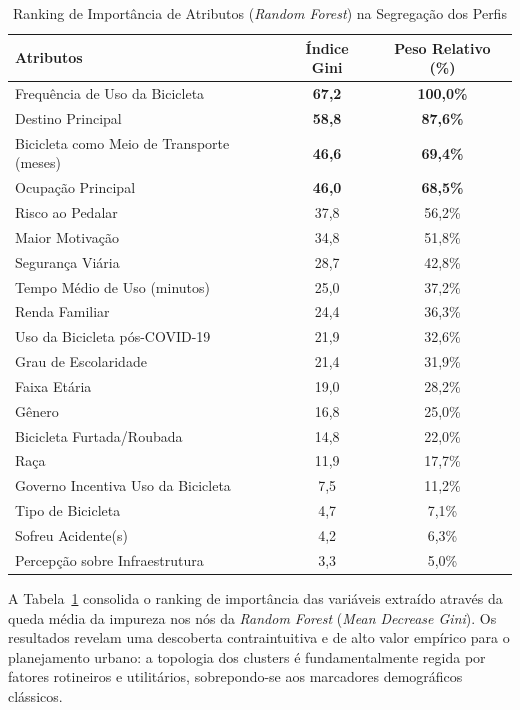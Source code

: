 \documentclass[12pt]{article}
\begin{document}
\begin{table}[htbp]
\centering
\caption{Ranking de Importância de Atributos (\textit{Random Forest}) na Segregação dos Perfis}
\label{tab:rf_importancia}
\begin{tabular}{@{}l|c|c@{}}
\hline \hline
   \textbf{Atributos}              & \textbf{Índice Gini} & \textbf{Peso Relativo (\%)} \\ 
\hline \hline
Frequência de Uso da Bicicleta     & \textbf{67,2} & \textbf{100,0\%} \\
Destino Principal                  & \textbf{58,8} & \textbf{87,6\%} \\
Bicicleta como Meio de Transporte (meses)  & \textbf{46,6} & \textbf{69,4\%} \\
Ocupação Principal                 & \textbf{46,0} & \textbf{68,5\%} \\
Risco ao Pedalar                   & 37,8 & 56,2\% \\
Maior Motivação                    & 34,8 & 51,8\% \\
Segurança Viária                   & 28,7 & 42,8\% \\
Tempo Médio de Uso (minutos)       & 25,0 & 37,2\% \\
Renda Familiar                     & 24,4 & 36,3\% \\
Uso da Bicicleta pós-COVID-19      & 21,9 & 32,6\% \\
Grau de Escolaridade               & 21,4 & 31,9\% \\
Faixa Etária                       & 19,0 & 28,2\% \\
Gênero                             & 16,8 & 25,0\% \\
Bicicleta Furtada/Roubada          & 14,8 & 22,0\% \\
Raça                               & 11,9 & 17,7\% \\
Governo Incentiva Uso da Bicicleta & 7,5  & 11,2\% \\
Tipo de Bicicleta                  & 4,7  & 7,1\% \\
Sofreu Acidente(s)                 & 4,2  & 6,3\% \\
Percepção sobre Infraestrutura     & 3,3  & 5,0\% \\ 
\hline \hline
\end{tabular}%
\end{table}

A Tabela~\ref{tab:rf_importancia} consolida o ranking de importância das variáveis extraído através da queda média da impureza nos nós da \textit{Random Forest} (\textit{Mean Decrease Gini}). Os resultados revelam uma descoberta contraintuitiva e de alto valor empírico para o planejamento urbano: a topologia dos clusters é fundamentalmente regida por fatores rotineiros e utilitários, sobrepondo-se aos marcadores demográficos clássicos.
\end{document}
